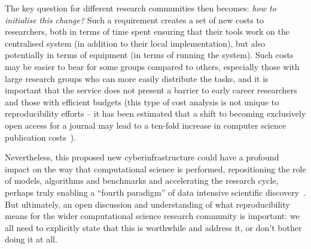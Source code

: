 \documentclass[a4paper,11pt]{article}
\begin{document}
The key question for different research communities then becomes:
{\emph{how to initialise this change?}} Such a requirement creates a
set of new costs to researchers, both in terms of time spent ensuring
that their tools work on the centralised system (in addition to their
local implementation), but also potentially in terms of equipment (in
terms of running the system). Such costs may be easier to bear for
some groups compared to others, especially those with large research
groups who can more easily distribute the tasks, and it is important
that the service does not present a barrier to early career
researchers and those with efficient budgets (this type of cost
analysis is not unique to reproducibility efforts -- it has been
estimated that a shift to becoming exclusively open access for a
journal may lead to a ten-fold increase in computer science
publication costs~\cite{vardi-cacm-2014}).

Nevertheless, this proposed new cyberinfrastructure could have a
profound impact on the way that computational science is performed,
repositioning the role of models, algorithms and benchmarks and
accelerating the research cycle, perhaps truly enabling a ``fourth
paradigm'' of data intensive scientific discovery~\cite{hey:2009}. But
ultimately, an open discussion and understanding of what
reproducibility means for the wider computational science research
community is important: we all need to explicitly state that this is
worthwhile and address it, or don't bother doing it at all.




\end{document}
